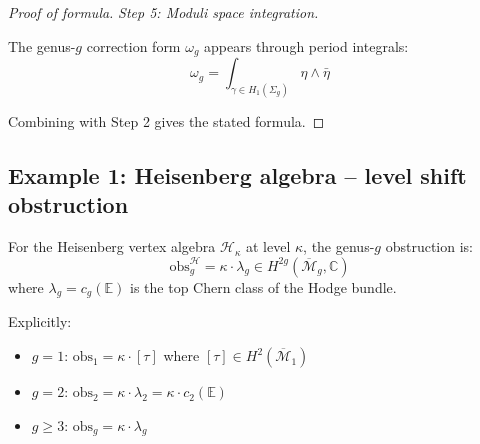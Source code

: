 \begin{proof}[Proof of formula]
\emph{Step 5: Moduli space integration.}

The genus-$g$ correction form $\omega_g$ appears through period integrals:
\[\omega_g = \int_{\gamma \in H_1(\Sigma_g)} \eta \wedge \bar{\eta}\]

Combining with Step 2 gives the stated formula.
\end{proof}

\subsection{Example 1: Heisenberg algebra -- level shift obstruction}
\label{subsec:heisenberg-obstruction}

\begin{theorem}\label{thm:heisenberg-obs}
For the Heisenberg vertex algebra $\mathcal{H}_\kappa$ at level $\kappa$, the 
genus-$g$ obstruction is:
\begin{equation}
\text{obs}_g^{\mathcal{H}} = \kappa \cdot \lambda_g \in H^{2g}(\overline{\mathcal{M}}_g, \mathbb{C})
\end{equation}
where $\lambda_g = c_g(\mathbb{E})$ is the top Chern class of the Hodge bundle.

Explicitly:
\begin{itemize}
\item $g=1$: $\text{obs}_1 = \kappa \cdot [\tau]$ where $[\tau] \in H^2(\overline{\mathcal{M}}_1)$
\item $g=2$: $\text{obs}_2 = \kappa \cdot \lambda_2 = \kappa \cdot c_2(\mathbb{E})$
\item $g \geq 3$: $\text{obs}_g = \kappa \cdot \lambda_g$
\end{itemize}
\end{theorem}

